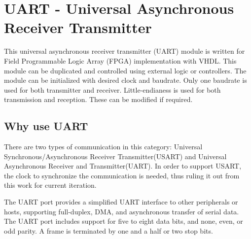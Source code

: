 \section{UART - Universal Asynchronous Receiver Transmitter}
This universal asynchronous receiver transmitter (UART) module is written for Field Programmable Logic Array (FPGA) implementation with VHDL. This module can be duplicated and controlled using external logic or controllers. The module can be initialized with desired clock and baudrate. Only one baudrate is used for both transmitter and receiver. Little-endianess is used for both transmission and reception. These can be modified if required.

\subsection{Why use UART}
There are two types of communication in this category: Universal Synchronous/Asynchronous Receiver Transmitter(USART) and Universal Asynchronous Receiver and Transmitter(UART).
In order to support USART, the clock to synchronize the communication is needed, thus ruling it out from this work for current iteration.

The UART port provides a simplified UART interface to other peripherals or hosts, supporting full-duplex, DMA, and asynchronous transfer of serial data. The UART port includes support for five to eight data bits, and none, even, or odd parity. A frame is terminated by one and a half or two stop bits.\cite{whyUart}

\newpage
